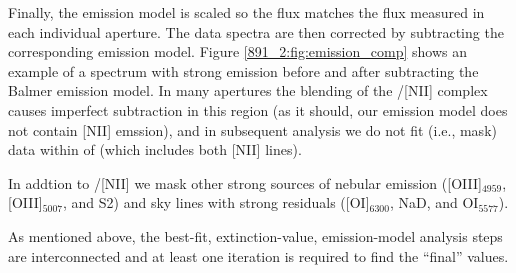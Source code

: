 Finally, the emission model is scaled so the \Ha flux matches the \Ha
flux measured in each individual aperture. The data spectra are then
corrected by subtracting the corresponding emission model. Figure
\ref{891_2:fig:emission_comp} shows an example of a spectrum with strong \HB
emission before and after subtracting the Balmer emission model. In
many apertures the blending of the \Ha/[NII] complex causes imperfect
subtraction in this region (as it should, our emission model does not
contain [NII] emssion), and in subsequent analysis we do not fit
(i.e., mask) data within  of \Ha (which includes
both [NII] lines).

In addtion to \Ha/[NII] we mask other strong sources of nebular
emission ([OIII]$_{4959}$, [OIII]$_{5007}$, and S2) and sky lines with
strong residuals ([OI]$_{6300}$, NaD, and OI$_{5577}$).


As mentioned above, the best-fit, extinction-value, emission-model
analysis steps are interconnected and at least one iteration is
required to find the ``final'' values.


